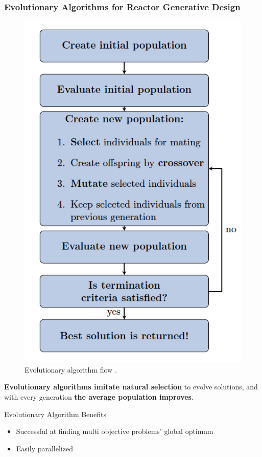     \begin{frame}
    \frametitle{Evolutionary Algorithms for Reactor Generative Design}
    \begin{minipage}[c]{0.49\textwidth}
        \begin{figure}
            \includegraphics[width=0.7\linewidth]{figures/ea-flow.png} 
            \caption{Evolutionary algorithm flow \cite{renner_genetic_2003}. }
          \end{figure}
    \end{minipage} \hfill
    \begin{minipage}{0.49\textwidth}
        \textbf{Evolutionary algorithms imitate natural selection} to evolve solutions,  
        and with every generation \textbf{the average population improves}. 

        Evolutionary Algorithm Benefits 
        \begin{itemize}
            \item Successful at finding multi objective problems' global optimum 
            \item Easily parallelized 
        \end{itemize}
        \end{minipage}
    \end{frame}

